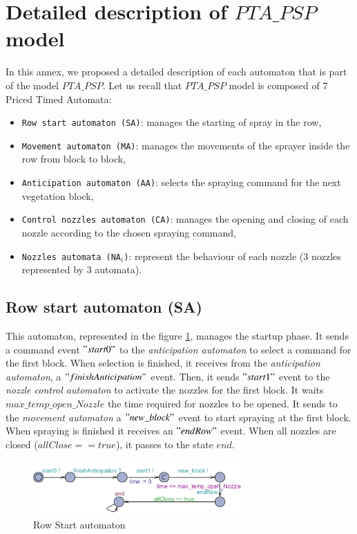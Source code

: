 \newpage

\section{Detailed description of $PTA\_PSP$ model}
\label{AnnexeModeles}
In this annex, we proposed a detailed description of each automaton that is part of the model $PTA\_PSP$. Let us recall that $PTA\_PSP$ model is composed of 7 Priced Timed Automata:
\begin{itemize}
	\item \texttt{Row start automaton (SA)}: manages the starting of spray in the row,
	\item \texttt{Movement automaton (MA)}: manages the movements of the sprayer inside the row from block to block,
	\item \texttt{Anticipation automaton (AA)}: selects the spraying command for the next vegetation block,
	\item \texttt{Control nozzles automaton (CA)}: manages the opening and closing of each nozzle according to the chosen spraying command,
	\item \texttt{Nozzles automata (NA$_i$)}: represent the behaviour of each nozzle (3 nozzles represented by 3 automata).
\end{itemize}

\subsection{\textbf{Row start automaton (SA)}}
This automaton, represented in the figure \ref{fig:start}, manages the startup phase. It sends a command event $"start0"$ to the \textit{anticipation automaton} to select a command for the first block. When selection is finished, it receives from the \textit{anticipation automaton}, a $"finishAnticipation"$ event. Then, it sends $"start1"$ event to the \textit{nozzle control automaton} to activate the nozzles for the first block. It waits $max\_temp\_open\_Nozzle$ the time required for nozzles to be opened. It sends to the \textit{movement automaton} a $"new \_block" $ event to start spraying at the first block. When spraying is finished it receives an $"endRow"$ event. When all nozzles are closed ($allClose == true$), it passes to the state $end$.

\begin{figure} [h!]
	\begin{center}
		\includegraphics[width = 8cm]{Vegetation.pdf}
		\caption{Row Start automaton} \label{fig:start}
	\end{center}
\end{figure}


